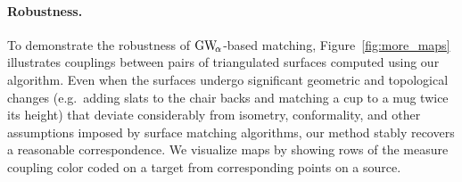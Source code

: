 \paragraph*{Robustness.} To demonstrate the robustness of $\GWa$-based matching, Figure~\ref{fig:more_maps} illustrates couplings between pairs of triangulated surfaces computed using our algorithm.  Even when the surfaces undergo significant geometric and topological changes (e.g.\ adding slats to the chair backs and matching a cup to a mug twice its height) that deviate considerably from isometry, conformality, and other assumptions imposed by surface matching algorithms, our method stably recovers a reasonable correspondence.  We visualize  maps by showing rows of the measure coupling color coded on a target from corresponding points on a source. %


